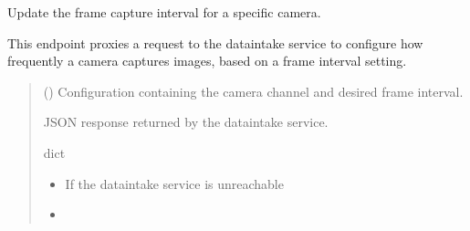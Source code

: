 \documentclass[letterpaper,10pt,english]{sphinxmanual}
\begin{document}
\begin{fulllineitems}
\label{\detokenize{modules/src.pig_sorting_api.main:src.pig_sorting_api.main.set_frame_interval}}
\pysigstartsignatures
\pysiglinewithargsret
{}
{}
{}
\pysigstopsignatures
\sphinxAtStartPar
Update the frame capture interval for a specific camera.

\sphinxAtStartPar
This endpoint proxies a request to the data\sphinxhyphen{}intake service to
configure how frequently a camera captures images, based on
a frame interval setting.
\begin{quote}\begin{description}
\sphinxAtStartPar
{} ({\hyperref[\detokenize{modules/src.pig_sorting_api.main:src.pig_sorting_api.main.FrameIntervalRequest}]{}}) \textendash{} Configuration containing the
camera channel and desired frame interval.

\sphinxAtStartPar
JSON response returned by the data\sphinxhyphen{}intake service.

\sphinxAtStartPar
dict

\begin{itemize}
\item {} 
\sphinxAtStartPar
{} \textendash{} If the data\sphinxhyphen{}intake service is unreachable

\item {} 
\sphinxAtStartPar
{} \textendash{} 

\end{itemize}

\end{description}\end{quote}

\end{fulllineitems}

\end{document}

